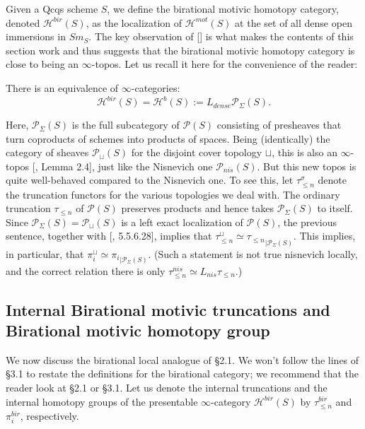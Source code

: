 Given a Qcqs scheme $S$, we define the birational motivic homotopy category, denoted $\mathcal{H}^{bir}(S)$, as the localization of $\mathcal{H}^{mot}(S)$ at the set of all dense open immersions in $Sm_S$. The key observation of [\cite{0bat}] is what makes the contents of this section work and thus suggests that the birational motivic homotopy category is close to being an $\infty$-topos. Let us recall it here for the convenience of the reader:
\begin{thm}\label{Hbir is Hb}
    There is an equivalence of $\infty$-categories:
    $$\mathcal{H}^{bir}(S)=\mathcal{H}^b(S):=L_{dense}\mathcal{P}_\Sigma(S).$$
\end{thm} 
Here, $\mathcal{P}_\Sigma(S)$ is the full subcategory of $\mathcal{P}(S)$ consisting of presheaves that turn coproducts of schemes into products of spaces. Being (identically) the category of sheaves $\mathcal{P}_{\sqcup}(S)$ for the disjoint cover topology $\sqcup$, this is also an $\infty$-topos [\cite{bachmann2017norms}, Lemma 2.4], just like the Nisnevich one $\mathcal{P}_{nis}(S)$. But this new topos is quite well-behaved compared to the Nisnevich one. To see this, let $\tau^\sigma_{\leq n}$ denote the truncation functors for the various topologies we deal with. The ordinary truncation $\tau_{\leq n}$ of $\mathcal{P}(S)$ preserves products and hence takes $\mathcal{P}_\Sigma(S)$ to itself. Since $\mathcal{P}_\Sigma(S)=\mathcal{P}_\sqcup(S)$ is a left exact localization of $\mathcal{P}(S)$, the previous sentence, together with [\cite{lurie2009higher}, 5.5.6.28], implies that $\tau_{\leq n}^{\sqcup}\simeq {\tau_{\leq n}}_{|\mathcal{P}_{\Sigma}(S)}$. This implies, in particular, that $\pi_i^\sqcup\simeq {\pi_i}_{|\mathcal{P}_\Sigma(S)}$. (Such a statement is not true nisnevich locally, and the correct relation there is only $\tau^{nis}_{\leq n}\simeq L_{nis}\tau_{\leq n}$.)
\subsection{Internal Birational motivic truncations and Birational motivic homotopy group}

We now discuss the birational local analogue of \S2.1. We won't follow the lines of \S3.1 to restate the definitions for the birational category; we recommend that the reader look at \S2.1 or \S3.1. Let us denote the internal truncations and the internal homotopy groups of the presentable $\infty$-category $\mathcal{H}^{bir}(S)$ by $\tau_{\leq n}^{bir}$ and $\pi_i^{bir}$, respectively.

